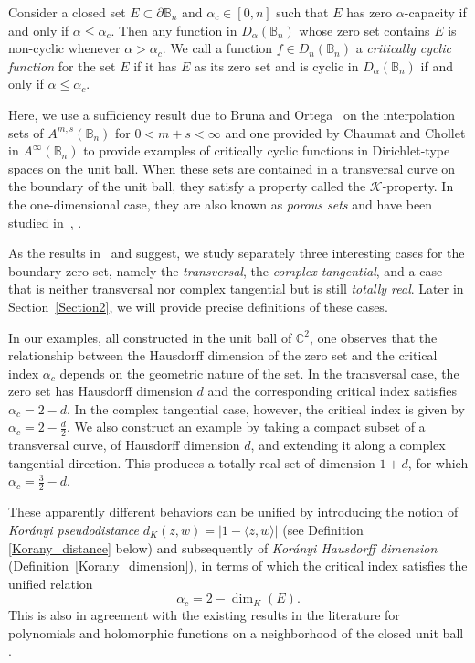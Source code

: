 \documentclass[a4paper,12pt]{amsart}
\theoremstyle{definition}
\theoremstyle{remark}
\def\C{\mathbb C}
\def\Bn{\mathbb{B}_n}
\begin{document}
        Consider a closed set $E \subset \partial \Bn$ and $\alpha_c \in [0,n]$ such that $E$ has zero $\alpha$-capacity if and only if $\alpha \leq \alpha_c$. Then any function in $D_\alpha(\Bn)$ whose zero set contains $E$ is non-cyclic whenever $\alpha > \alpha_c$. We call a function $f \in D_n(\Bn)$ a \emph{critically cyclic function} for the set $E$ if it has $E$ as its zero set and is cyclic in $D_\alpha(\Bn)$ if and only if $\alpha \leq \alpha_c$.

        Here, we use a sufficiency result due to Bruna and Ortega~\cite{Bruna1986} on the interpolation sets of $A^{m,s}(\Bn)$ for $0 < m + s < \infty$ and one provided by Chaumat and Chollet \cite{Chaumat_Chollet_Hausdorff} in $A^\infty(\Bn)$ to provide examples of critically cyclic functions in Dirichlet-type spaces on the unit ball. When these sets are contained in a transversal curve on the boundary of the unit ball, they satisfy a property called the $\mathcal{K}$-property. In the one-dimensional case, they are also known as \emph{porous sets} and have been studied in~\cite{Thomas_Nicolau_Borichev_Porous}, \cite{Dyn79}.
        
        As the results in~\cite{Bruna1986} and \cite{Chaumat_Chollet_Hausdorff} suggest, we study separately three interesting cases for the boundary zero set, namely the \emph{transversal}, the \emph{complex tangential}, and a case that is neither transversal nor complex tangential but is still \emph{totally real}. Later in Section~{\ref{Section2}}, we will provide precise definitions of these cases.

        In our examples, all constructed in the unit ball of $\C^2$, one observes that the relationship between the Hausdorff dimension of the zero set and the critical index $\alpha_c$ depends on the geometric nature of the set.
        In the transversal case, the zero set has Hausdorff dimension $d$ and the corresponding critical index satisfies $\alpha_c = 2 - d$.
        In the complex tangential case, however, the critical index is given by $\alpha_c = 2 - \frac{d}{2}$.
        We also construct an example by taking a compact subset of a transversal curve, of Hausdorff dimension $d$, and extending it along a complex tangential direction.
        This produces a totally real set of dimension $1 + d$, for which $\alpha_c = \frac{3}{2} - d$.
        
        These apparently different behaviors can be unified by introducing the notion of \emph{Kor\'anyi pseudodistance}
$d_K(z,w)= |1 - \langle z, w \rangle|$
(see Definition \ref{Korany_distance} below)
and subsequently of
        \emph{Kor\'anyi Hausdorff dimension} (Definition~\ref{Korany_dimension}), in terms of which the critical index satisfies the unified relation
        \[
        \alpha_c = 2 - \dim_{K}(E).
        \]
        This is also in agreement with the existing results in the literature for polynomials
        \cite{Kosinski_Vavitsas2023, Vavitsas2, VavitsasNonCyc}
        and holomorphic functions on a neighborhood of the closed unit ball
        \cite{Pouriya_SecondPaper}.
\end{document}
